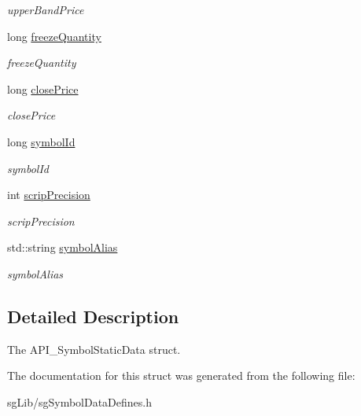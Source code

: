 \begin{DoxyCompactItemize}
\begin{DoxyCompactList}\small\item\em upper\-Band\-Price \end{DoxyCompactList}\item 
\hypertarget{struct_a_p_i2_1_1_symbol_static_data_ada5ac23aa7596dec098fa482e0bf5dc0}{long \hyperlink{struct_a_p_i2_1_1_symbol_static_data_ada5ac23aa7596dec098fa482e0bf5dc0}{freeze\-Quantity}}\label{struct_a_p_i2_1_1_symbol_static_data_ada5ac23aa7596dec098fa482e0bf5dc0}

\begin{DoxyCompactList}\small\item\em freeze\-Quantity \end{DoxyCompactList}\item 
\hypertarget{struct_a_p_i2_1_1_symbol_static_data_a0f93c2fb95f2623ca5826a5fb705a8f3}{long \hyperlink{struct_a_p_i2_1_1_symbol_static_data_a0f93c2fb95f2623ca5826a5fb705a8f3}{close\-Price}}\label{struct_a_p_i2_1_1_symbol_static_data_a0f93c2fb95f2623ca5826a5fb705a8f3}

\begin{DoxyCompactList}\small\item\em close\-Price \end{DoxyCompactList}\item 
\hypertarget{struct_a_p_i2_1_1_symbol_static_data_a7cddd330b1a2fad9f4113488ba0839ba}{long \hyperlink{struct_a_p_i2_1_1_symbol_static_data_a7cddd330b1a2fad9f4113488ba0839ba}{symbol\-Id}}\label{struct_a_p_i2_1_1_symbol_static_data_a7cddd330b1a2fad9f4113488ba0839ba}

\begin{DoxyCompactList}\small\item\em symbol\-Id \end{DoxyCompactList}\item 
\hypertarget{struct_a_p_i2_1_1_symbol_static_data_a32fecd3d7339e805752719516154c977}{int \hyperlink{struct_a_p_i2_1_1_symbol_static_data_a32fecd3d7339e805752719516154c977}{scrip\-Precision}}\label{struct_a_p_i2_1_1_symbol_static_data_a32fecd3d7339e805752719516154c977}

\begin{DoxyCompactList}\small\item\em scrip\-Precision \end{DoxyCompactList}\item 
\hypertarget{struct_a_p_i2_1_1_symbol_static_data_aa2e596d4cbc7828ecc96e9ab55c86f54}{std\-::string \hyperlink{struct_a_p_i2_1_1_symbol_static_data_aa2e596d4cbc7828ecc96e9ab55c86f54}{symbol\-Alias}}\label{struct_a_p_i2_1_1_symbol_static_data_aa2e596d4cbc7828ecc96e9ab55c86f54}

\begin{DoxyCompactList}\small\item\em symbol\-Alias \end{DoxyCompactList}\end{DoxyCompactItemize}


\subsection{Detailed Description}
The A\-P\-I\-\_\-\-Symbol\-Static\-Data struct. 

The documentation for this struct was generated from the following file\-:\begin{DoxyCompactItemize}
\item 
sg\-Lib/sg\-Symbol\-Data\-Defines.\-h\end{DoxyCompactItemize}

